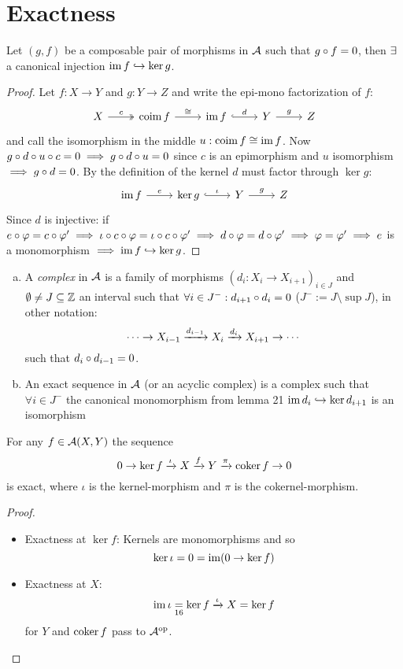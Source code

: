 \documentclass[a4paper]{report}
\begin{document}
\section{Exactness}
\begin{lemm}
  Let $(g,f)$ be a composable pair of morphisms in $\mathcal{A}$ such that $g \circ f = 0$, then $\exists$ a canonical injection $\operatorname{im} f \hookrightarrow \ker g$.
\end{lemm}
\begin{proof}
  Let $f: X \to Y$ and $g: Y \to Z$ and write the epi-mono factorization of $f$:
  \[\begin{tikzcd}
X \arrow[r, "c", two heads] & \coim f \arrow[r, "\cong"] & \im f \arrow[r, "d", hook] & Y \arrow[r, "g"] & Z
\end{tikzcd}\]and call the isomorphism in the middle $u: \operatorname{coim} f \cong \operatorname{im} f$.
Now $g \circ d \circ u \circ c = 0 \implies g \circ d \circ u = 0$ since $c$ is an epimorphism and $u$ isomorphism $\implies g \circ d = 0$. By the definition of the kernel $d$ must factor through $\ker g$:
\[\begin{tikzcd}
\im f \arrow[r, "e"] & \ker g \arrow[r, "\iota", hook] & Y \arrow[r, "g"] & Z
\end{tikzcd}\]
Since $d$ is injective: if $e \circ \varphi = c \circ \varphi ' \implies \iota \circ c \circ \varphi = \iota \circ c \circ \varphi' \implies d \circ \varphi = d \circ \varphi' \implies \varphi = \varphi ' \implies e$ is a monomorphism $\implies \operatorname{im} f \hookrightarrow \ker g$.
\end{proof}

\begin{defi}
\begin{enumerate}[(a)]
  \item A \emph{complex} in $\mathcal{A}$ is a family of morphisms $(d_{i}: X_{i} \to X_{i+1})_{i \in J}$ and $\emptyset \ne J \subseteq \mathbb{Z}$ an interval such that $\forall i \in J^{-}: d_{i+1} \circ d_{i} = 0$ ($J^{-}:= J \setminus \sup J$), in other notation:
        \[ \cdots \to X_{i-1} \xrightarrow {d_{i-1}} X_{i} \xrightarrow {d_{i}} X_{i+1} \to \cdots\]such that $d_{i} \circ d_{i-1} = 0$.
        \item An exact sequence in $\mathcal{A}$ (or an acyclic complex) is a complex such that $\forall i \in J^{-}$ the canonical monomorphism from lemma 21 $\operatorname{im} d_{i} \hookrightarrow \ker d_{i+1}$ is an isomorphism
\end{enumerate}
\end{defi}


\begin{prop}
  For any $f \in \mathcal{A}(X,Y)$ the sequence \[0 \to \ker f \xrightarrow \iota X \xrightarrow f Y \xrightarrow \pi \operatorname{coker} f \to 0\]
  is exact, where $\iota$ is the kernel-morphism and $\pi$ is the cokernel-morphism.
  \begin{proof}
\begin{itemize}
  \item Exactness at $\ker f$: Kernels are monomorphisms and so \[\ker \iota = 0 = \operatorname{im}(0 \to \ker f)\]
  \item Exactness at $X$:
        \[\operatorname{im} \iota \underset {16} = \ker f \xrightarrow \iota X = \ker f\]
        for $Y$ and $\operatorname{coker} f$ pass to $\mathcal{A}^\mathrm{op}$.
\end{itemize}
  \end{proof}
\end{prop}
\end{document}
